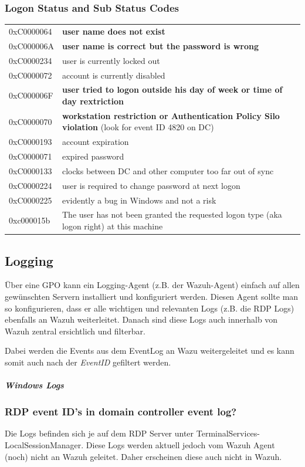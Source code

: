 \subsubsection{Logon Status and Sub Status Codes}
\begin{tabular}{ l | p{4.5cm} }
    0xC0000064 & \textbf{user name does not exist} \\
    0xC000006A & \textbf{user name is correct but the password is wrong} \\  
    0xC0000234 & user is currently locked out \\  
    0xC0000072 & account is currently disabled \\
    0xC000006F & \textbf{user tried to logon outside his day of week or time of day rextriction} \\
    0xC0000070 & \textbf{workstation restriction or Authentication Policy Silo violation} (look for event ID 4820 on DC) \\
    0xC0000193 & account expiration \\
    0xC0000071 & expired password \\
    0xC0000133 & clocks between DC and other computer too far out of sync \\
    0xC0000224 & user is required to change password at next logon \\
    0xC0000225 & evidently a bug in Windows and not a risk \\
    0xc000015b & The user has not been granted the requested logon type (aka logon right) at this machine
\end{tabular}

\subsection{Logging}
Über eine GPO kann ein Logging-Agent (z.B. der Wazuh-Agent) einfach auf allen gewünschten Servern installiert und konfiguriert werden. Diesen Agent sollte man so konfigurieren, dass er alle wichtigen und relevanten Logs (z.B. die RDP Logs) ebenfalls an Wazuh weiterleitet. Danach sind diese Logs auch innerhalb von Wazuh zentral ersichtlich und filterbar.

Dabei werden die Events aus dem EventLog an Wazu weitergeleitet und es kann somit auch nach der \textit{EventID} gefiltert werden.

\subparagraph{Windows Logs}

\subsubsection{RDP event ID's in domain controller event log?}
Die Logs befinden sich je auf dem RDP Server unter TerminalServices-LocalSessionManager.
Diese Logs werden aktuell jedoch vom Wazuh Agent (noch) nicht an Wazuh geleitet. Daher erscheinen diese auch nicht in Wazuh. 

